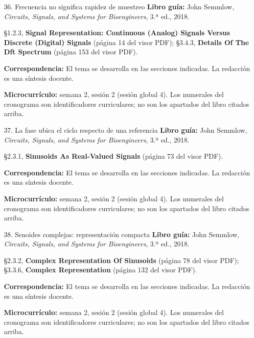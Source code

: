 \documentclass[
  10pt,
  ignorenonframetext,
  aspectratio=169,
  spanish,
]{beamer}
\begin{document}
\begin{frame}{36. Frecuencia no significa rapidez de muestreo}
\label{frecuencia-no-significa-rapidez-de-muestreo}
\textbf{Libro guía:} John Semmlow, \emph{Circuits, Signals, and Systems
for Bioengineers}, 3.ª ed., 2018.

§1.2.3, \textbf{Signal Representation: Continuous (Analog) Signals
Versus Discrete (Digital) Signals} (página 14 del visor PDF); §3.4.3,
\textbf{Details Of The Dft Spectrum} (página 153 del visor PDF).

\textbf{Correspondencia:} El tema se desarrolla en las secciones
indicadas. La redacción es una síntesis docente.

\textbf{Microcurrículo:} semana 2, sesión 2 (sesión global 4). Los
numerales del cronograma son identificadores curriculares; no son los
apartados del libro citados arriba.
\end{frame}

\begin{frame}{37. La fase ubica el ciclo respecto de una referencia}
\label{la-fase-ubica-el-ciclo-respecto-de-una-referencia}
\textbf{Libro guía:} John Semmlow, \emph{Circuits, Signals, and Systems
for Bioengineers}, 3.ª ed., 2018.

§2.3.1, \textbf{Sinusoids As Real-Valued Signals} (página 73 del visor
PDF).

\textbf{Correspondencia:} El tema se desarrolla en las secciones
indicadas. La redacción es una síntesis docente.

\textbf{Microcurrículo:} semana 2, sesión 2 (sesión global 4). Los
numerales del cronograma son identificadores curriculares; no son los
apartados del libro citados arriba.
\end{frame}

\begin{frame}{38. Senoides complejas: representación compacta}
\label{senoides-complejas-representaciuxf3n-compacta}
\textbf{Libro guía:} John Semmlow, \emph{Circuits, Signals, and Systems
for Bioengineers}, 3.ª ed., 2018.

§2.3.2, \textbf{Complex Representation Of Sinusoids} (página 78 del
visor PDF); §3.3.6, \textbf{Complex Representation} (página 132 del
visor PDF).

\textbf{Correspondencia:} El tema se desarrolla en las secciones
indicadas. La redacción es una síntesis docente.

\textbf{Microcurrículo:} semana 2, sesión 2 (sesión global 4). Los
numerales del cronograma son identificadores curriculares; no son los
apartados del libro citados arriba.
\end{frame}
\end{document}
